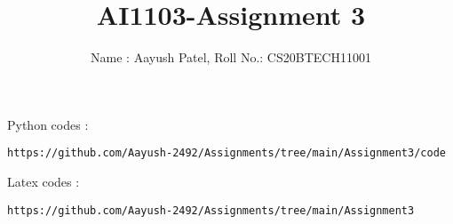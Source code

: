 \documentclass[journal,12pt,twocolumn]{IEEEtran}
\DeclareMathOperator*{\Res}{Res}
\begin{document}
\newcommand{\BEQA}{\begin{eqnarray}}
\newcommand{\EEQA}{\end{eqnarray}}
\newcommand{\define}{\stackrel{\triangle}{=}}

\raggedbottom
\setlength{\parindent}{0pt}
\providecommand{\mbf}{\mathbf}
\providecommand{\pr}[1]{\ensuremath{\Pr\left(#1\right)}}
\providecommand{\qfunc}[1]{\ensuremath{Q\left(#1\right)}}
\providecommand{\sbrak}[1]{\ensuremath{{}\left[#1\right]}}
\providecommand{\lsbrak}[1]{\ensuremath{{}\left[#1\right.}}
\providecommand{\rsbrak}[1]{\ensuremath{{}\left.#1\right]}}
\providecommand{\brak}[1]{\ensuremath{\left(#1\right)}}
\providecommand{\lbrak}[1]{\ensuremath{\left(#1\right.}}
\providecommand{\rbrak}[1]{\ensuremath{\left.#1\right)}}
\providecommand{\cbrak}[1]{\ensuremath{\left\{#1\right\}}}
\providecommand{\lcbrak}[1]{\ensuremath{\left\{#1\right.}}
\providecommand{\rcbrak}[1]{\ensuremath{\left.#1\right\}}}
\theoremstyle{remark}
\newtheorem{rem}{Remark}
\newcommand{\sgn}{\mathop{\mathrm{sgn}}}
\providecommand{\abs}[1]{\vert#1\vert}
\providecommand{\res}[1]{\Res\displaylimits_{#1}} 
\providecommand{\norm}[1]{\lVert#1\rVert}
\providecommand{\mtx}[1]{\mathbf{#1}}
\providecommand{\mean}[1]{E[ #1 ]}
\providecommand{\fourier}{\overset{\mathcal{F}}{ \rightleftharpoons}}
\providecommand{\system}{\overset{\mathcal{H}}{ \longleftrightarrow}}
\newcommand{\solution}{\noindent \textbf{Solution: }}
\newcommand{\cosec}{\,\text{cosec}\,}
\providecommand{\dec}[2]{\ensuremath{\overset{#1}{\underset{#2}{\gtrless}}}}
\newcommand{\myvec}[1]{\ensuremath{\begin{pmatrix}#1\end{pmatrix}}}
\newcommand{\mydet}[1]{\ensuremath{\begin{vmatrix}#1\end{vmatrix}}}
\makeatletter
{}
\makeatother
\let\StandardTheFigure\thefigure
\let\vec\mathbf
\renewcommand{\thefigure}{\theproblem}
\def\putbox#1#2#3{\makebox[0in][l]{\makebox[#1][l]{}\raisebox{\baselineskip}[0in][0in]{\raisebox{#2}[0in][0in]{#3}}}}
     \def\rightbox#1{\makebox[0in][r]{#1}}
     \def\centbox#1{\makebox[0in]{#1}}
     \def\topbox#1{\raisebox{-\baselineskip}[0in][0in]{#1}}
     \def\midbox#1{\raisebox{-0.5\baselineskip}[0in][0in]{#1}}
\vspace{3cm}
\title{AI1103-Assignment 3}
\author{Name : Aayush Patel, Roll No.: CS20BTECH11001}
\maketitle
\newpage
\bigskip
\renewcommand{\thefigure}{\theenumi}
\renewcommand{\thetable}{\theenumi}
Python codes : 
\begin{lstlisting}
https://github.com/Aayush-2492/Assignments/tree/main/Assignment3/code
\end{lstlisting}
%
Latex codes : 
%
\begin{lstlisting}
https://github.com/Aayush-2492/Assignments/tree/main/Assignment3
\end{lstlisting}
\end{document}
